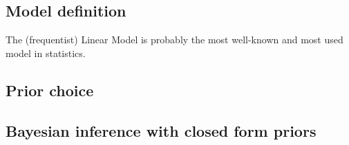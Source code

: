 


\subsection{Model definition}

The (frequentist) Linear Model is probably the most well-known and most used model in statistics. 

\subsection{Prior choice}



\subsection{Bayesian inference with closed form priors}
